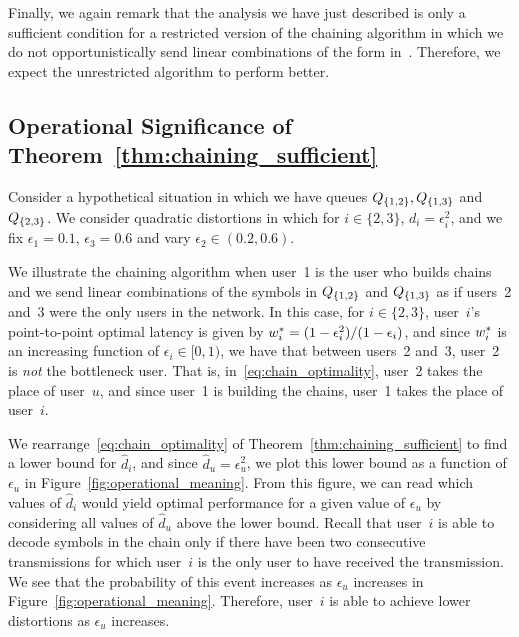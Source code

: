 Finally, we again remark that the analysis we have just described is only a sufficient condition for a restricted version of the chaining algorithm in which we do not opportunistically send linear combinations of the form in~.  Therefore, we expect the unrestricted algorithm to perform better.

\subsection{Operational Significance of Theorem~\ref{thm:chaining_sufficient}}
\label{sec:operational_meaning}

Consider a hypothetical situation in which we have queues $Q_{\{1, 2\}}, Q_{\{1, 3\}}$ and $Q_{\{2, 3\}}$.   We consider quadratic distortions in which for $i \in \{2, 3\}$,  $d_i = \epsilon_i^2$, and we fix $\epsilon_1 = 0.1$, $\epsilon_3 = 0.6$ and vary $\epsilon_2 \in (0.2, 0.6)$.  

We illustrate the chaining algorithm when user~1 is the user who builds chains and we send linear combinations of the symbols in $Q_{\{1, 2\}}$ and $Q_{\{1, 3\}}$ as if users~2 and~3 were the only users in the network.  In this case, for $i \in \{2, 3\}$, user~$i$'s point-to-point optimal latency is given by $w_{i}^{*} = (1 - \epsilon_i^2)/(1 - \epsilon_i)$, and since $w_{i}^{*}$ is an increasing function of $\epsilon_i \in [0, 1)$, we have that between users~2 and~3, user~2 is \emph{not} the bottleneck user.  That is, in~\eqref{eq:chain_optimality}, user~2 takes the place of user~$u$, and since user~1 is building the chains, user~1 takes the place of user~$i$.

We rearrange~\eqref{eq:chain_optimality} of Theorem~\ref{thm:chaining_sufficient} to find a lower bound for $\hat{d}_i$, and since $\hat{d}_u = \epsilon_u^2$, we  plot this lower bound as a function of $\epsilon_u$ in Figure~\ref{fig:operational_meaning}.  From this figure, we can read which values of $\hat{d}_i$ would yield optimal performance for a given value of $\epsilon_u$ by considering all values of $\hat{d}_u$ above the lower bound.  Recall that user~$i$ is able to decode symbols in the chain only if there have been two consecutive transmissions for which user~$i$ is the only user to have received the transmission.  We see that the probability of this event increases as $\epsilon_u$ increases in Figure~\ref{fig:operational_meaning}.  Therefore, user~$i$ is able to achieve lower distortions as $\epsilon_u$ increases.  

